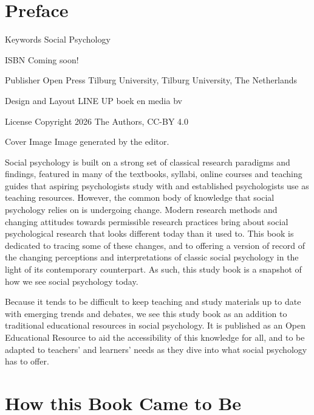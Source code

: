 \documentclass[
  letterpaper,
]{book}
\begin{document}
\chapter*{\texorpdfstring{{Preface}}{Preface}}\label{preface}


Keywords {Social Psychology}

ISBN {Coming soon!}

Publisher {Open Press Tilburg University, Tilburg University, The
Netherlands}

Design and Layout {LINE UP boek en media bv}

License {Copyright 2026 The Authors, CC-BY 4.0}

Cover Image {Image generated by the editor.}

Social psychology is built on a strong set of classical research
paradigms and findings, featured in many of the textbooks, syllabi,
online courses and teaching guides that aspiring psychologists study
with and established psychologists use as teaching resources. However,
the common body of knowledge that social psychology relies on is
undergoing change. Modern research methods and changing attitudes
towards permissible research practices bring about social psychological
research that looks different today than it used to. This book is
dedicated to tracing some of these changes, and to offering a version of
record of the changing perceptions and interpretations of classic social
psychology in the light of its contemporary counterpart. As such, this
study book is a snapshot of how we see social psychology today.

Because it tends to be difficult to keep teaching and study materials up
to date with emerging trends and debates, we see this study book as an
addition to traditional educational resources in social psychology. It
is published as an Open Educational Resource to aid the accessibility of
this knowledge for all, and to be adapted to teachers' and learners'
needs as they dive into what social psychology has to offer.


\chapter*{\texorpdfstring{{How this Book Came to
Be}}{How this Book Came to Be}}\label{how-this-book-came-to-be}
\end{document}
